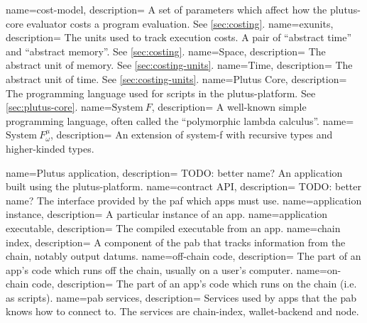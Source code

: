 {
  name=cost-model,
  description={
    A set of parameters which affect how the \gls{plutus-core} evaluator costs a program evaluation.
    See \cref{sec:costing}.
  }
}
{
  name=exunits,
  description={
    The units used to track execution costs.
    A pair of ``abstract time'' and ``abstract memory''.
    See \cref{sec:costing}.
  }
}
{
  name=Space,
  description={
    The abstract unit of memory.
    See \cref{sec:costing-units}.
  }
}
{
  name=Time,
  description={
    The abstract unit of time.
    See \cref{sec:costing-units}.
  }
}
{
  name=Plutus Core,
  description={
    The programming language used for \glspl{script} in the \gls{plutus-platform}.
    See \cref{sec:plutus-core}.
  }
}
{
  name={\ensuremath{\textrm{System}\ F}},
  description={
    A well-known simple programming language, often called the ``polymorphic lambda calculus''.
  }
}
{
  name={\ensuremath{\textrm{System}\ F_{\omega}^\mu}},
  description={
    An extension of \gls{system-f} with recursive types and higher-kinded types.
  }
}

{
  name=Plutus application,
  description={
    TODO: better name?
    An application built using the \gls{plutus-platform}.
  }
}
{
  name=contract API,
  description={
    TODO: better name?
    The interface provided by the \gls{paf} which \glspl{app} must use.
  }
}
{
  name=application instance,
  description={
    A particular instance of an \gls{app}.
  }
}
{
  name=application executable,
  description={
    The compiled executable from an \gls{app}.
  }
}
{
  name=chain index,
  description={
    A component of the \gls{pab} that tracks information from the chain, notably output \glspl{datum}.
  }
}
{
  name=off-chain code,
  description={
    The part of an \gls{app}'s code which runs off the chain, usually on a user's computer.
  }
}
{
  name=on-chain code,
  description={
    The part of an \gls{app}'s code which runs on the chain (i.e. as scripts).
  }
}
{ name={\gls{pab} services},
  description={
    Services used by \glspl{app} that the \gls{pab} knows how to connect to.
    The services are \gls{chain-index}, \gls{wallet-backend} and \gls{node}.
  }
}

